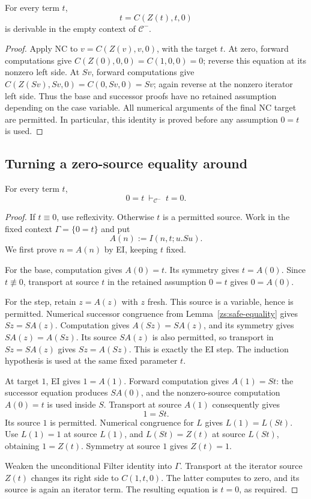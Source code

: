 \begin{lemma}
\label{zs:filter}
For every term $t$,
\[
                 t=C(Z(t),t,0)
                 \tag{Filter}\label{zs:filter-equation}
\]
is derivable in the empty context of $\mathcal C^{-}$.
\end{lemma}
\begin{proof}
Apply NC to $v=C(Z(v),v,0)$, with the target $t$.
At zero, forward computations give
$C(Z(0),0,0)=C(1,0,0)=0$; reverse this equation at its nonzero
left side. At $Sv$, forward computations give
$C(Z(Sv),Sv,0)=C(0,Sv,0)=Sv$; again reverse at the nonzero
iterator left side. Thus the base and successor proofs have no
retained assumption depending on the case variable. All numerical
arguments of the final NC target are permitted. In particular, this
identity is proved before any assumption $0=t$ is used.
\end{proof}

\subsection{Turning a zero-source equality around}

\begin{lemma}
\label{zs:zero-symmetry}
For every term $t$,
\[
                     0=t\ \vdash_{\mathcal C^{-}}\ t=0.
                     \tag{ZS}\label{zs:zero-symmetry-equation}
\]
\end{lemma}
\begin{proof}
If $t\equiv0$, use reflexivity. Otherwise $t$ is a permitted source.
Work in the fixed context $\Gamma=\{0=t\}$ and put
\[
                  A(n):=I(n,t;u.Su).
\]
We first prove $n=A(n)$ by EI, keeping $t$ fixed.

For the base, computation gives $A(0)=t$. Its symmetry gives
$t=A(0)$. Since $t\not\equiv0$, transport at source $t$ in the
retained assumption $0=t$ gives $0=A(0)$.

For the step, retain $z=A(z)$ with $z$ fresh. This source is a
variable, hence is permitted. Numerical successor congruence from
Lemma~\ref{zs:safe-equality} gives $Sz=S A(z)$.
Computation gives $A(Sz)=S A(z)$, and its symmetry gives
$S A(z)=A(Sz)$. Its source $S A(z)$ is also permitted, so transport
in $Sz=S A(z)$ gives $Sz=A(Sz)$. This is exactly the EI step.
The induction hypothesis is used at the same fixed parameter $t$.

At target $1$, EI gives $1=A(1)$. Forward computation gives
$A(1)=St$: the successor equation produces $S A(0)$, and the
nonzero-source computation $A(0)=t$ is used inside $S$.
Transport at source $A(1)$ consequently gives
\[
                              1=St.
\]
Its source $1$ is permitted. Numerical congruence for $L$ gives
$L(1)=L(St)$. Use $L(1)=1$ at source $L(1)$, and
$L(St)=Z(t)$ at source $L(St)$, obtaining $1=Z(t)$.
Symmetry at source $1$ gives $Z(t)=1$.

Weaken the unconditional Filter identity into $\Gamma$.
Transport at the iterator source $Z(t)$ changes its right side to
$C(1,t,0)$. The latter computes to zero, and its source is again
an iterator term. The resulting equation is $t=0$, as required.
\end{proof}

